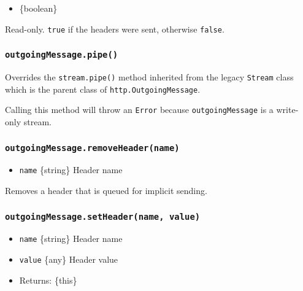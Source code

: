 \begin{itemize}
\tightlist
\item
  \{boolean\}
\end{itemize}

Read-only. \texttt{true} if the headers were sent, otherwise
\texttt{false}.

\subsubsection{\texorpdfstring{\texttt{outgoingMessage.pipe()}}{outgoingMessage.pipe()}}\label{outgoingmessage.pipe}

Overrides the \texttt{stream.pipe()} method inherited from the legacy
\texttt{Stream} class which is the parent class of
\texttt{http.OutgoingMessage}.

Calling this method will throw an \texttt{Error} because
\texttt{outgoingMessage} is a write-only stream.

\subsubsection{\texorpdfstring{\texttt{outgoingMessage.removeHeader(name)}}{outgoingMessage.removeHeader(name)}}\label{outgoingmessage.removeheadername}

\begin{itemize}
\tightlist
\item
  \texttt{name} \{string\} Header name
\end{itemize}

Removes a header that is queued for implicit sending.

\begin{Shaded}
\begin{Highlighting}[]
\NormalTok{(}\NormalTok{)}\OperatorTok{;}
\end{Highlighting}
\end{Shaded}

\subsubsection{\texorpdfstring{\texttt{outgoingMessage.setHeader(name,\ value)}}{outgoingMessage.setHeader(name, value)}}\label{outgoingmessage.setheadername-value}

\begin{itemize}
\tightlist
\item
  \texttt{name} \{string\} Header name
\item
  \texttt{value} \{any\} Header value
\item
  Returns: \{this\}
\end{itemize}

